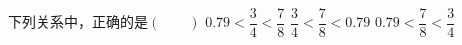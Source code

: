 下列关系中，正确的是\hfill$\left(\qquad\right)$
 {$0.79<\dfrac {3}{4}<\dfrac {7}{8}$}
{$\dfrac {3}{4}<\dfrac {7}{8}<0.79$} {$0.79<\dfrac {7}{8}<\dfrac {3}{4}$}
